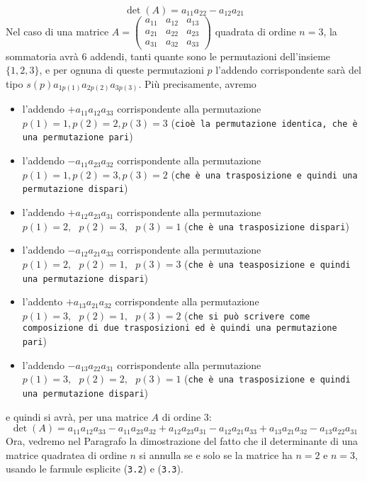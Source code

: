        \begin{equation}
		\det(A)=a_{11}a_{22}-a_{12}a_{21}
       \end{equation}
       Nel caso di una matrice $A= \begin{pmatrix}
                                     a_{11} & a_{12} & a_{13}\\
                                     a_{21} & a_{22} & a_{23}\\
                                     a_{31} & a_{32} & a_{33}
                                   \end{pmatrix}$ quadrata di ordine $n = 3$, la sommatoria avrà 6 addendi, tanti quante sono le permutazioni dell'insieme $\{1,2,3\}$, e per ognuna di queste permutazioni $p$ l'addendo corrispondente sarà del tipo $s(p)a_{1p(1)}a_{2p(2)}a_{3p(3)}$. Più precisamente, avremo
\begin{itemize}
\item l'addendo $+a_{11}a_{12}a_{33}$ corrispondente alla permutazione $p(1) = 1, p(2) =2, p(3) =3$ ({\tt cioè la permutazione identica, che è una permutazione pari})
\item l'addendo $-a_{11}a_{23}a_{32}$ corrispondente alla permutazione $p(1) = 1, p(2) =3, p(3) =2$ ({\tt che è una trasposizione e quindi una permutazione dispari})
\item l'addendo $+a_{12}a_{23}a_{31}$ corrispondente alla permutazione $p(1)=2,\text{ }p(2)=3,\text{ }p(3)=1$ ({\tt che è una trasposizione dispari})
\item l'addendo $-a_{12}a_{21}a_{33}$ corrispondente alla permutazione $p(1)=2,\text{ }p(2)=1,\text{ } p(3)=3$ ({\tt che è una teasposizione e quindi una permutazione dispari})
\item l'addento $+a_{13}a_{21}a_{32}$ corrispondente alla permutazione $p(1)=3,\text{ } p(2)=1,\text{ } p(3)=2$ ({\tt che si può scrivere come composizione di due trasposizioni ed è quindi una permutazione pari})
\item l'addendo $-a_{13}a_{22}a_{31}$ corrispondente alla permutazione $p(1) = 3,\text{ }p(2) = 2,\text{ }p(3)=1$ ({\tt che è una trasposizione e quindi una permutazione dispari})
\end{itemize}
e quindi si avrà, per una matrice $A$ di ordine 3: 
\begin{equation}
	\det(A)=a_{11}a_{12}a_{33}-a_{11}a_{23}a_{32}+a_{12}a_{23}a_{31}-a_{12}a_{21}a_{33}+a_{13}a_{21}a_{32}-a_{13}a_{22}a_{31}
\end{equation}
Ora, vedremo nel Paragrafo la dimostrazione del fatto che il determinante di una matrice quadratea di ordine $n$ si annulla se e solo se la matrice ha $n=2$ e $n=3$, usando le farmule esplicite ({\tt 3.2}) e ({\tt 3.3}).\\
